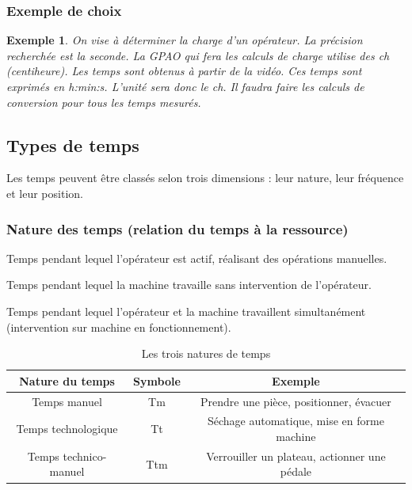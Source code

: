 \documentclass[a4paper,12pt]{article}
\newtheorem{exemple}{Exemple}[section]
\begin{document}
\subsubsection{Exemple de choix}

\begin{exemple}
On vise à déterminer la charge d'un opérateur. La précision recherchée est la seconde. La GPAO qui fera les calculs de charge utilise des ch (centiheure). Les temps sont obtenus à partir de la vidéo. Ces temps sont exprimés en h:min:s. L'unité sera donc le ch. Il faudra faire les calculs de conversion pour tous les temps mesurés.
\end{exemple}

\subsection{Types de temps}

Les temps peuvent être classés selon trois dimensions : leur nature, leur fréquence et leur position.

\subsubsection{Nature des temps (relation du temps à la ressource)}

\begin{description}[labelwidth=4cm]
    \item[Temps manuel (Tm)] Temps pendant lequel l'opérateur est actif, réalisant des opérations manuelles.
    \item[Temps technologique (Tt)] Temps pendant lequel la machine travaille sans intervention de l'opérateur.
    \item[Temps technico-manuel (Ttm)] Temps pendant lequel l'opérateur et la machine travaillent simultanément (intervention sur machine en fonctionnement).
\end{description}

\begin{table}[ht]
\centering
\begin{tabular}{|c|c|c|}
\hline
\textbf{Nature du temps} & \textbf{Symbole} & \textbf{Exemple} \\
\hline
Temps manuel & Tm & Prendre une pièce, positionner, évacuer \\
Temps technologique & Tt & Séchage automatique, mise en forme machine \\
Temps technico-manuel & Ttm & Verrouiller un plateau, actionner une pédale \\
\hline
\end{tabular}
\caption{Les trois natures de temps}
\end{table}
\end{document}
